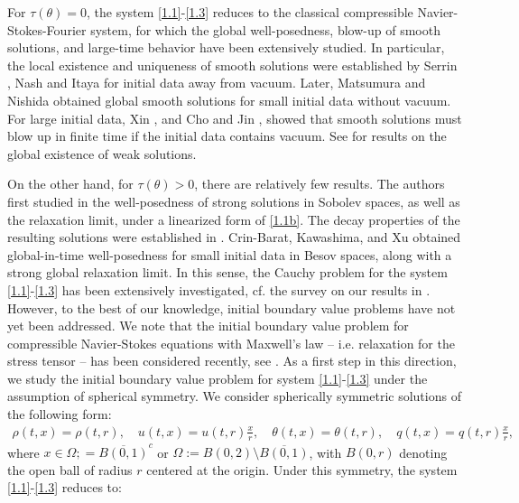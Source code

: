 \documentclass[11pt,reqno]{amsart}
\numberwithin{equation}{section}
\begin{document}
For \(\tau(\theta) = 0\), the system \eqref{1.1}-\eqref{1.3} reduces to the classical compressible Navier-Stokes-Fourier system, for which the global well-posedness, blow-up of smooth solutions, and large-time behavior have been extensively studied. In particular, the local existence and uniqueness of smooth solutions were established by Serrin \cite{SE}, Nash \cite{NA} and Itaya \cite{ITA70} for initial data away from vacuum. Later, Matsumura and Nishida \cite{MN} obtained global smooth solutions for small initial data without vacuum. For large initial data, Xin \cite{X}, and Cho and Jin \cite{CJ}, showed that smooth solutions must blow up in finite time if the initial data contains vacuum. See \cite{DA1, DA2, LI, JZ01, JZ03, FE} for results on the global existence of weak solutions.

On the other hand, for \(\tau(\theta) > 0\), there are relatively few results. The authors  first studied in \cite{HR16} the well-posedness of strong solutions in Sobolev spaces, as well as the relaxation limit, under a linearized form of \eqref{1.1b}. The decay properties of the resulting solutions were established in \cite{LW23,TZZ24}. Crin-Barat, Kawashima, and Xu \cite{CKX24} obtained global-in-time well-posedness for small initial data in Besov spaces, along with a strong global relaxation limit. In this sense, the Cauchy problem for the system \eqref{1.1}-\eqref{1.3} has been extensively investigated, cf. the survey on our results in \cite{Ra025-cam}. However, to the best of our knowledge, initial boundary value problems have not yet been addressed.  We note that the initial boundary value problem  for compressible Navier-Stokes equations with Maxwell's law -- i.e. relaxation for the stress tensor -- has been considered recently, see \cite{HL25, HY25, HZ25}. 
As a first step in this direction, we study the initial boundary value problem for system \eqref{1.1}-\eqref{1.3} under the assumption of spherical symmetry.
We consider spherically symmetric solutions of the following form:
\begin{align}\label{1.4}
\rho(t,x)=\rho(t,r), \quad u(t,x)=u(t, r)\frac{x}{r}, \quad \theta(t,x)=\theta(t,r), \quad q(t,x)=q(t,r)\frac{x}{r},
\end{align}
where $x\in \Omega ;= \overline{B(0,1)}^c$ or $\Omega := B(0,2)\setminus \overline{B(0,1)}$, with $B(0,r)$ denoting the open ball of radius $r$ centered at the origin. Under this symmetry, the system \eqref{1.1}-\eqref{1.3} reduces to:
\end{document}

